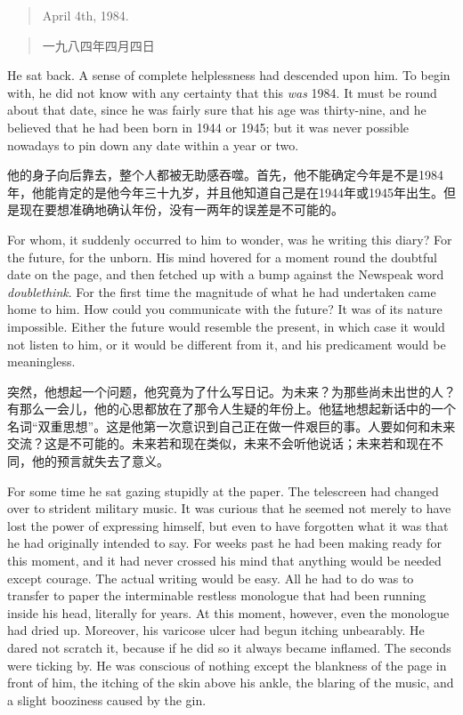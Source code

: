 \begin{paracol}{2}
\begin{quotation}
  April 4th, 1984.
\end{quotation}

\switchcolumn

\begin{quotation}
一九八四年四月四日
\end{quotation}

\switchcolumn*

He sat back. A sense of complete helplessness had descended upon him. To
begin with, he did not know with any certainty that this \emph{was} 1984. It
must be round about that date, since he was fairly sure that his age was
thirty-nine, and he believed that he had been born in 1944 or 1945; but it
was never possible nowadays to pin down any date within a year or two.

\switchcolumn

他的身子向后靠去，整个人都被无助感吞噬。首先，他不能确定今年是不是1984年，他能肯定的是他今年三十九岁，并且他知道自己是在1944年或1945年出生。但是现在要想准确地确认年份，没有一两年的误差是不可能的。

\switchcolumn*

For whom, it suddenly occurred to him to wonder, was he writing this
diary? For the future, for the unborn. His mind hovered for a moment
round the doubtful date on the page, and then fetched up with a bump
against the Newspeak word \emph{doublethink}. For the first time the
magnitude of what he had undertaken came home to him. How could you
communicate with the future? It was of its nature impossible. Either the
future would resemble the present, in which case it would not listen to
him, or it would be different from it, and his predicament would be
meaningless.

\switchcolumn

突然，他想起一个问题，他究竟为了什么写日记。为未来？为那些尚未出世的人？有那么一会儿，他的心思都放在了那令人生疑的年份上。他猛地想起新话中的一个名词``双重思想''。这是他第一次意识到自己正在做一件艰巨的事。人要如何和未来交流？这是不可能的。未来若和现在类似，未来不会听他说话；未来若和现在不同，他的预言就失去了意义。

\switchcolumn*

For some time he sat gazing stupidly at the paper. The telescreen had
changed over to strident military music. It was curious that he seemed
not merely to have lost the power of expressing himself, but even to
have forgotten what it was that he had originally intended to say. For
weeks past he had been making ready for this moment, and it had never
crossed his mind that anything would be needed except courage. The
actual writing would be easy. All he had to do was to transfer to paper
the interminable restless monologue that had been running inside his
head, literally for years. At this moment, however, even the monologue
had dried up. Moreover, his varicose ulcer had begun itching unbearably.
He dared not scratch it, because if he did so it always became inflamed.
The seconds were ticking by. He was conscious of nothing except the
blankness of the page in front of him, the itching of the skin above his
ankle, the blaring of the music, and a slight booziness caused by the
gin.


\end{paracol}
